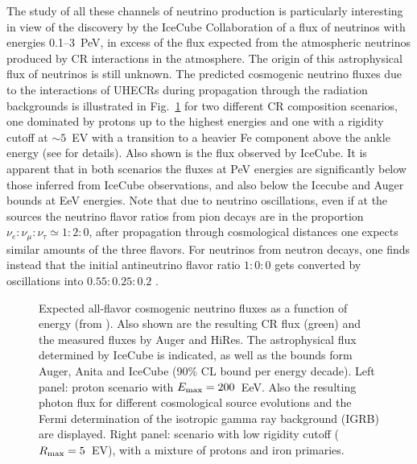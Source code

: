 \documentclass[twoside,12pt]{article}
\begin{document}
The study of all these channels of neutrino production is particularly interesting in view of the discovery by the IceCube Collaboration \cite{hese} of a flux of neutrinos with energies 0.1--3~PeV, in excess of the flux expected from the atmospheric neutrinos produced by CR interactions in the atmosphere. The origin of this astrophysical flux of neutrinos is still unknown. The predicted cosmogenic neutrino fluxes due to the interactions of UHECRs during propagation through the radiation backgrounds is illustrated in Fig.~\ref{cosmonu.fig} for two different CR composition scenarios, one dominated by protons up to the highest energies and one with a rigidity cutoff at $\sim 5$~EV with a transition to a heavier Fe component above the ankle energy (see \cite{cosmonu} for details). Also shown is the flux observed by IceCube. It is apparent that in both scenarios the fluxes at PeV energies are significantly below those inferred from IceCube observations, and also below the Icecube and Auger bounds at EeV energies. Note that due to neutrino oscillations, even if at the sources the neutrino flavor ratios from pion decays are in the proportion $\nu_e:\nu_\mu:\nu_\tau \simeq 1:2:0$, after propagation through cosmological distances one expects similar amounts of the three flavors. For neutrinos from neutron decays, one finds instead that the initial antineutrino flavor ratio $1:0:0$ gets converted by oscillations into $0.55:0.25:0.2$ \cite{ch09}.


\begin{figure}[tb]
\begin{center}
\begin{minipage}[t]{8 cm}
\centerline{}
\end{minipage}
\caption{Expected all-flavor cosmogenic neutrino fluxes as a function of energy (from \cite{cosmonu}).  Also shown are the resulting CR flux (green) and the measured fluxes by Auger and HiRes. The   astrophysical flux determined by IceCube is indicated, as well as the bounds form Auger, Anita and IceCube (90\% CL bound per energy decade).  Left panel: proton scenario with $E_{\rm max}=200$~EeV. Also the resulting photon flux for different cosmological source evolutions and the Fermi determination of the isotropic gamma ray background (IGRB) are displayed. Right panel: scenario with low rigidity cutoff ($R_{\rm max}=5$~EV), with a mixture of protons and iron primaries. \label{cosmonu.fig}}
\end{center}
\end{figure}
\end{document}
